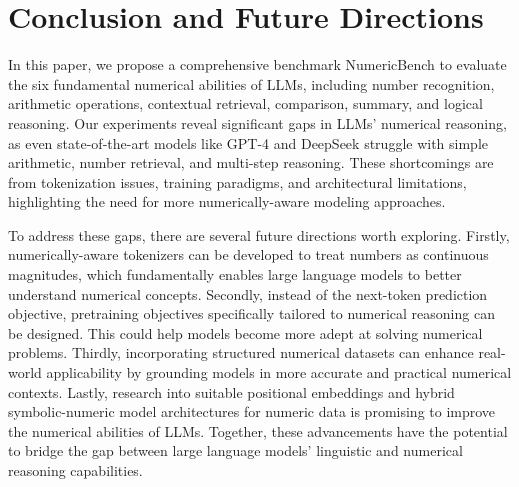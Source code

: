\section{Conclusion and Future Directions}
In this paper, we propose a comprehensive benchmark NumericBench   to evaluate the six  fundamental numerical  abilities of LLMs, including number recognition, arithmetic operations, contextual retrieval, comparison, summary, and logical reasoning. 
Our experiments reveal significant gaps in LLMs' numerical reasoning, as even state-of-the-art models like GPT-4 and DeepSeek struggle with simple arithmetic, number retrieval, and multi-step reasoning. 
These shortcomings are from tokenization issues, training paradigms, and architectural limitations, highlighting the need for more numerically-aware modeling approaches.

To address these gaps, there are several future directions worth exploring. Firstly,  numerically-aware tokenizers can be developed to treat numbers as continuous magnitudes, which fundamentally enables large language models to better understand numerical concepts.
Secondly, instead of the next-token prediction objective,  pretraining objectives specifically tailored to numerical reasoning can be designed. 
This could help models become more adept at solving numerical problems.
Thirdly, incorporating structured numerical datasets can enhance real-world applicability by grounding models in more accurate and practical numerical contexts.
Lastly, research into suitable positional embeddings and hybrid symbolic-numeric model architectures for numeric data is promising to improve the numerical abilities of LLMs.
Together, these advancements have the potential to bridge the gap between large language models' linguistic and numerical reasoning capabilities.

